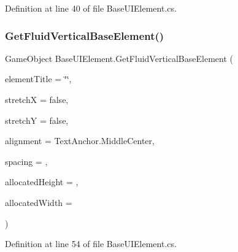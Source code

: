 Definition at line 40 of file Base\+U\+I\+Element.\+cs.

\mbox{\label{class_base_u_i_element_a8080c783c4cf125ffd73abc41b701847}} 
\subsubsection{\texorpdfstring{Get\+Fluid\+Vertical\+Base\+Element()}{GetFluidVerticalBaseElement()}}
{\footnotesize\ttfamily Game\+Object Base\+U\+I\+Element.\+Get\+Fluid\+Vertical\+Base\+Element (\begin{DoxyParamCaption}\item[{string}]{element\+Title = {\ttfamily \char`\"{}\char`\"{}},  }\item[{bool}]{stretchX = {\ttfamily false},  }\item[{bool}]{stretchY = {\ttfamily false},  }\item[{Text\+Anchor}]{alignment = {\ttfamily TextAnchor.MiddleCenter},  }\item[{int}]{spacing = {},  }\item[{int}]{allocated\+Height = {},  }\item[{int}]{allocated\+Width = {} }\end{DoxyParamCaption})\hspace{0.3cm}{\ttfamily [protected]}}



Definition at line 54 of file Base\+U\+I\+Element.\+cs.

\mbox{\label{class_base_u_i_element_a54c09af57514cd421eee80888928a8c3}} 
